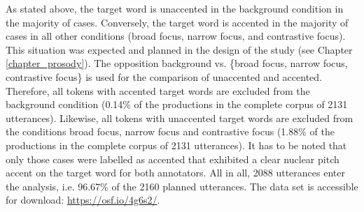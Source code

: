 As stated above, the target word is unaccented in the background condition in the majority of cases. Conversely, the target word is accented in the majority of cases in all other conditions (broad focus, narrow focus, and contrastive focus). This situation was expected and planned in the design of the study (see Chapter \ref{chapter_prosody}). The opposition background vs. \{broad focus, narrow focus, contrastive focus\} is used for the comparison of unaccented and accented. Therefore, all tokens with accented target words are excluded from the background condition (0.14\% of the productions in the complete corpus of 2131 utterances). Likewise, all tokens with unaccented target words are excluded from the conditions broad focus, narrow focus and contrastive focus (1.88\% of the productions in the complete corpus of 2131 utterances). It has to be noted that only those cases were labelled as accented that exhibited a clear nuclear pitch accent on the target word for both annotators. All in all, 2088 utterances enter the analysis, i.e. 96.67\% of the 2160 planned utterances. The data set is accessible for download: \href{https://osf.io/4g6s2/}{https://osf.io/4g6s2/}.

